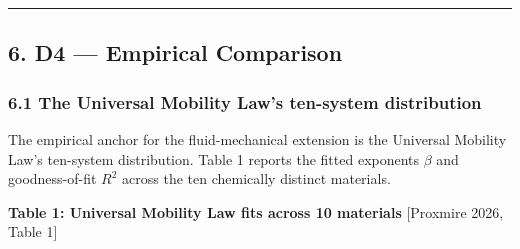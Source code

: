 \documentclass[
  11pt,a4paper]{article}
\begin{document}
\begin{center}\rule{0.5\linewidth}{0.5pt}\end{center}

\subsection{6. D4 --- Empirical
Comparison}\label{d4-empirical-comparison}

\subsubsection{6.1 The Universal Mobility Law's ten-system
distribution}\label{the-universal-mobility-laws-ten-system-distribution}

The empirical anchor for the fluid-mechanical extension is the Universal
Mobility Law's ten-system distribution. Table 1 reports the fitted
exponents \(\beta\) and goodness-of-fit \(R^2\) across the ten
chemically distinct materials.

\textbf{Table 1: Universal Mobility Law fits across 10 materials}
{[}Proxmire 2026, Table 1{]}
\end{document}
